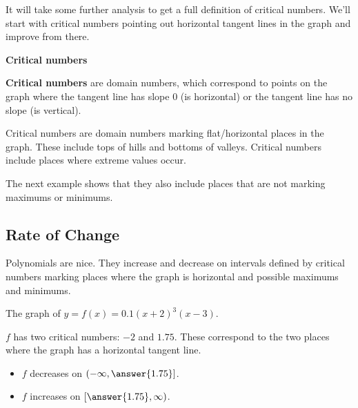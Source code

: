 \documentclass{ximera}
\begin{document}
It will take some further analysis to get a full definition of critical numbers. We'll start with critical numbers pointing out horizontal tangent lines in the graph and improve from there.









\begin{definition} \item \textbf{\textcolor{green!50!black}{Critical numbers}}

\textbf{Critical numbers} are domain numbers, which correspond to points on the graph where the tangent line has slope $0$ (is horizontal) or the tangent line has no slope (is vertical).

\end{definition}




Critical numbers are domain numbers marking flat/horizontal places in the graph.  These include tops of hills and bottoms of valleys. Critical numbers include places where extreme values occur.


The next example shows that they also include places that are not marking maximums or minimums.














\subsection*{Rate of Change}



Polynomials are nice.  They increase and decrease on intervals defined by critical numbers marking places where the graph is horizontal and possible maximums and minimums.









\begin{example}

The graph of $y = f(x) = 0.1(x+2)^3(x-3)$.



\begin{center}
\end{center}



$f$ has two critical numbers: $-2$ and $1.75$. These correspond to the two places where the graph has a horizontal tangent line.

\begin{itemize}
\item $f$ decreases on $\left(-\infty, \answer{1.75}\right]$.
\item $f$ increases on $\left[\answer{1.75}, \infty\right)$.
\end{itemize}




\end{example}
\end{document}
